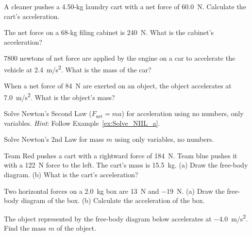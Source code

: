 \documentclass[main.tex]{subfiles}
\begin{document}
\begin{exercise} \label{goj4oA}
    A cleaner pushes a 4.50-kg laundry cart with a net force of \SI{60.0}{N}. Calculate the cart's acceleration.
\end{exercise}

\begin{exercise} \label{G333de}
    The net force on a 68-kg filing cabinet is \SI{240}{N}. What is the cabinet's acceleration?
\end{exercise}

\begin{exercise} \label{8M4KDp}
    7800 newtons of net force are applied by the engine on a car to accelerate the vehicle at \SI{2.4}{m/s^2}. What is the mass of the car?
\end{exercise}

\begin{exercise} \label{EAtsO8}
    When a net force of \SI{84}{N} are exerted on an object, the object accelerates at \SI{7.0}{m/s^2}. What is the object's mass?
\end{exercise}

\begin{exercise} \label{vuAqX8}
    Solve Newton's Second Law ($F_{\text{net}} = ma$) for acceleration using no numbers, only variables. \textit{Hint}: Follow Example~\ref{ex:Solve_NIIL_a}.
\end{exercise}

\begin{exercise} \label{zVvXad}
    Solve Newton's 2nd Law for mass $m$ using only variables, no numbers.
\end{exercise}

\begin{exercise} \label{XfTcUv}
Team Red pushes a cart with a rightward force of \SI{184}{N}. Team blue pushes it with a \SI{122}{N} force to the left. The cart's mass is \SI{15.5}{kg}. (a) Draw the free-body diagram. (b) What is the cart's acceleration?
\end{exercise}

\begin{exercise} \label{uawqLb}
    Two horizontal forces on a \SI{2.0}{kg} box are \SI{13}{N} and \SI{-19}{N}. (a) Draw the free-body diagram of the box. (b) Calculate the acceleration of the box. 
\end{exercise}

\begin{exercise} \label{FWDsH3}
The object represented by the free-body diagram below accelerates at \SI{-4.0}{m/s^2}. Find the mass $m$ of the object.
\end{exercise}
\end{document}
